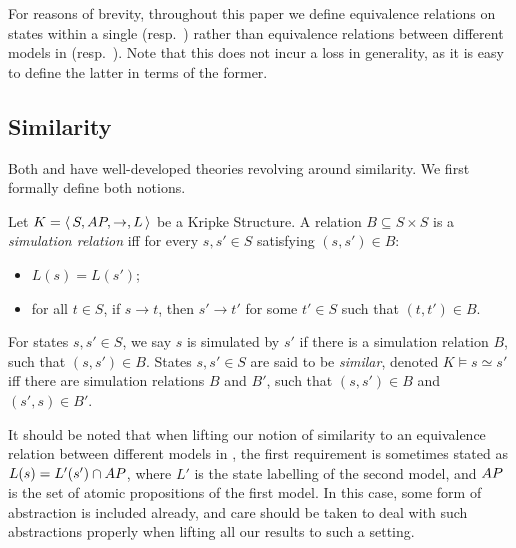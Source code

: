 \documentclass{llncs}
\newcommand{\kstrans}{\to}
\begin{document}
\begin{remark}
For reasons of brevity, throughout this paper we define equivalence
relations on states within a single \LTS (resp.\ \KS) rather than
equivalence relations between different models in \LTS (resp.\ \KS). Note
that this does not incur a loss in generality, as it is easy to define
the latter in terms of the former.

\end{remark}

\subsection{Similarity}
\label{sec:similarity}

Both \KS and \LTS have well-developed theories revolving around
similarity. We first formally define both notions.

\newcommand{\simm}{\simeq}
\begin{definition}
Let $K = \tuple{S,\AP,\kstrans,L}$ be a Kripke Structure. A relation
$B \subseteq S \times S$ is a \emph{simulation relation} iff for every
$s,s' \in S$ satisfying $(s,s') \in B$:
\begin{itemize}
\item $L(s) = L(s')$;
\item for all $t \in S$, if $s \kstrans t$, then $s' \kstrans t'$ for
some $t' \in S$ such that $(t,t') \in B$.

\end{itemize}
For states $s,s' \in S$, we say $s$ is simulated by $s'$ if there is
a simulation relation $B$, such that $(s,s') \in B$. States $s,s' \in
S$ are said to be \emph{similar}, denoted $K \models s \simm s'$ iff
there are simulation relations $B$ and $B'$, such that $(s,s') \in B$
and $(s',s) \in B'$.

\end{definition}
\begin{remark}
It should be noted that when lifting our notion of similarity to
an equivalence relation between different models in \KS,
the first requirement is sometimes stated as $L(s) = L'(s') \cap AP$,
where $L'$ is the state labelling of the second \KS model, and $AP$
is the set of atomic propositions of the first \KS model. In this
case, some form of abstraction is included already, and care should be
taken to deal with such abstractions properly when lifting all our results to
such a setting.
\end{remark}
\end{document}
